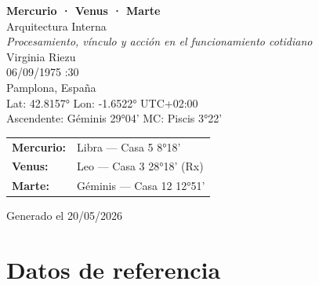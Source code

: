\documentclass[11pt,a4paper]{article}
\begin{document}

\begin{titlepage}
  \centering

  \vspace*{2cm}

  {\Huge\bfseries\color{azulai} Mercurio · Venus · Marte}\\[0.6cm]

  {\large\color{grisai} Arquitectura Interna}\\[0.4cm]

  {\small\itshape\color{grisai}
  Procesamiento, vínculo y acción en el funcionamiento cotidiano
  }\\[2.2cm]

  {\huge\color{doradoai} Virginia Riezu}\\[1.6cm]

  {\Large 06/09/1975 :30}\\[0.35cm]

  {\Large Pamplona, España}\\[0.35cm]

  {\normalsize
  Lat: 42.8157° \quad
  Lon: -1.6522° \quad
  UTC+02:00
  }\\[0.35cm]

  {\normalsize
  Ascendente: Géminis 29°04'
  \quad
  MC: Piscis 3°22'
  }\\[2.2cm]

  \renewcommand{\arraystretch}{1.35}

  \begin{tabular}{ll}
    \textbf{Mercurio:} & Libra — Casa 5 8°18' \\
    \textbf{Venus:}    & Leo — Casa 3 28°18' (Rx) \\
    \textbf{Marte:}    & Géminis — Casa 12 12°51' \\
  \end{tabular}

  \vfill

  {\small\color{grisai}
  Generado el 20/05/2026
  }

\end{titlepage}

\justifying

\tableofcontents

\clearpage

\section{Datos de referencia}
\end{document}
